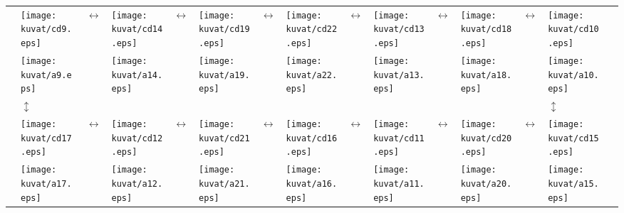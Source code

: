 \documentclass[11pt]{article} %
\begin{document}
\begin{center}
\begin{tabular}{>{\small}p{0.07cm} p{0.4cm}
                >{\small}p{0.07cm} p{0.4cm}
                >{\small}p{0.07cm} p{0.4cm}
                >{\small}p{0.07cm} p{0.4cm}
                >{\small}p{0.07cm} p{0.4cm}
                >{\small}p{0.07cm} p{0.4cm}
                >{\small}p{0.07cm} p{0.4cm}
                >{\small}p{0.07cm}}
& \texttt{[image: kuvat/cd9.eps]} &$\leftrightarrow$&
\texttt{[image: kuvat/cd14.eps]} &$\leftrightarrow$&
\texttt{[image: kuvat/cd19.eps]} &$\leftrightarrow$&
\texttt{[image: kuvat/cd22.eps]} &$\leftrightarrow$&
\texttt{[image: kuvat/cd13.eps]} &$\leftrightarrow$&
\texttt{[image: kuvat/cd18.eps]} &$\leftrightarrow$&
\texttt{[image: kuvat/cd10.eps]} & \\
& \texttt{[image: kuvat/a9.eps]} &&
\texttt{[image: kuvat/a14.eps]} &&
\texttt{[image: kuvat/a19.eps]} &&
\texttt{[image: kuvat/a22.eps]} &&
\texttt{[image: kuvat/a13.eps]} &&
\texttt{[image: kuvat/a18.eps]} &&
\texttt{[image: kuvat/a10.eps]} & \\
&$\updownarrow$ & & & & & & & & & & & &$\updownarrow$& \\
& \texttt{[image: kuvat/cd17.eps]} &$\leftrightarrow$&
\texttt{[image: kuvat/cd12.eps]} &$\leftrightarrow$&
\texttt{[image: kuvat/cd21.eps]} &$\leftrightarrow$&
\texttt{[image: kuvat/cd16.eps]} &$\leftrightarrow$&
\texttt{[image: kuvat/cd11.eps]} &$\leftrightarrow$&
\texttt{[image: kuvat/cd20.eps]} &$\leftrightarrow$&
\texttt{[image: kuvat/cd15.eps]} & \\
& \texttt{[image: kuvat/a17.eps]} &&
\texttt{[image: kuvat/a12.eps]} &&
\texttt{[image: kuvat/a21.eps]} &&
\texttt{[image: kuvat/a16.eps]} &&
\texttt{[image: kuvat/a11.eps]} &&
\texttt{[image: kuvat/a20.eps]} &&
\texttt{[image: kuvat/a15.eps]} & \\
\end{tabular}
\end{center}




\end{document}
